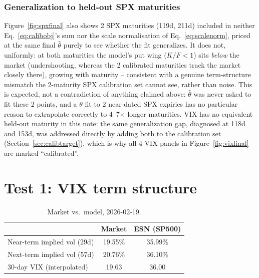 \documentclass[11pt]{article}
\begin{document}
\subsubsection{Generalization to held-out SPX maturities}
\label{sec:heldout}
Figure~\ref{fig:spxfinal} also shows 2 SPX maturities (119d, 211d)
included in neither Eq.~\eqref{eq:calibobj}'s sum nor the scale
normalisation of Eq.~\eqref{eq:scalenorm}, priced at the same final
$\hat\theta$ purely to see whether the fit generalizes. It does not,
uniformly: at both maturities the model's put wing ($K/F<1$) sits
\emph{below} the market (undershooting, whereas the 2 calibrated
maturities track the market closely there), growing with maturity --
consistent with a genuine term-structure mismatch the 2-maturity SPX
calibration set cannot see, rather than noise. This is expected, not
a contradiction of anything claimed above: $\hat\theta$ was never
asked to fit these 2 points, and a $\theta$ fit to 2 near-dated SPX
expiries has no particular reason to extrapolate correctly to
4--7$\times$ longer maturities. VIX has no equivalent held-out
maturity in this note: the same generalization gap, diagnosed at 118d
and 153d, was addressed directly by adding both to the calibration
set (Section~\ref{sec:calibtarget}), which is why all 4 VIX panels in
Figure~\ref{fig:vixfinal} are marked ``calibrated''.

\FloatBarrier
\section{Test 1: VIX term structure}
\label{sec:results}

\begin{table}[h]
\centering
\caption{Market vs.\ model, 2026-02-19.}
\label{tab:vixresult}
\begin{tabular}{lcc}
\toprule
& Market & ESN (SP500) \\
\midrule
Near-term implied vol (29d) & 19.55\% & 35.99\% \\
Next-term implied vol (57d) & 20.76\% & 36.10\% \\
30-day VIX (interpolated) & 19.63 & 36.00 \\
\bottomrule
\end{tabular}
\end{table}
\end{document}
